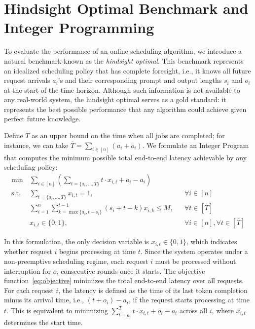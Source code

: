\documentclass[11pt, a4paper]{article}
\theoremstyle{plain}
\theoremstyle{definition}
\theoremstyle{remark}
\begin{document}
\section{Hindsight Optimal Benchmark and Integer Programming} \label{sec:HO}

To evaluate the performance of an online scheduling algorithm, we introduce a natural benchmark known as the \textit{hindsight optimal}. This benchmark represents an idealized scheduling policy that has complete foresight, i.e., it knows all future request arrivals $a_i$'s and their corresponding prompt and output lengths $s_i$ and $o_i$ at the start of the time horizon. Although such information is not available to any real-world system, the hindsight optimal serves as a gold standard: it represents the best possible performance that any algorithm could achieve given perfect future knowledge.

Define $\bar T$ as an upper bound on the time when all jobs are completed; for instance, we can take $\bar T = \sum_{i \in [n]}(a_i+o_i)$.  We formulate an Integer Program that computes the minimum possible total end-to-end latency achievable by any scheduling policy:
%
\begin{align}
\min \,& \sum_{i \in [n]} \left(\sum_{t=\{a_i, \dots, \bar T\}} t \cdot x_{i,t}+o_i-a_i \right)  \label{eq:objective} \\
\text{s.t.}\, 
& \sum_{t=\{a_i, \dots, \bar T\}} x_{i,t} = 1, && \forall i \in [n] \label{eq:start_once} \\
&  \sum_{i=1}^{n} \sum_{k=\max\{a_i,t-o_i\}}^{t-1} (s_i+t-k)x_{i,k} \leq M, && \forall t \in [\bar T] \label{eq:memory_constraint} \\
& x_{i,t} \in \{0,1\}, && \forall i \in [n], \forall t \in [\bar T] \label{eq:integrality}
\end{align}



In this formulation, the only decision variable is \( x_{i,t} \in \{0,1\} \), which indicates whether request \( i \) begins processing at time \( t \). Since the system operates under a non-preemptive scheduling regime, each request $i$ must be processed without interruption for \( o_i \) consecutive rounds once it starts. The objective function~\eqref{eq:objective} minimizes the total end-to-end latency over all requests. For each request \( i \), the latency is defined as the time of its last token completion minus its arrival time, i.e., \( (t + o_i) - a_i \), if the request starts processing at time \( t \). This is equivalent to minimizing \( \sum_{t=a_i}^{\bar T} t \cdot x_{i,t} + o_i - a_i  \) across all \( i \), where \( x_{i,t} \) determines the start time.
\end{document}

